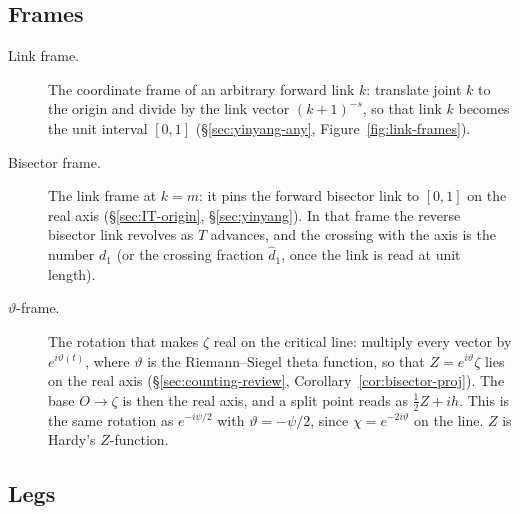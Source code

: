 \documentclass[11pt]{article}
\theoremstyle{definition}
\begin{document}
\subsection*{Frames}

\begin{description}
\item[Link frame.]
The coordinate frame of an arbitrary forward link $k$: translate
joint $k$ to the origin and divide by the link vector $(k+1)^{-s}$,
so that link $k$ becomes the unit interval $[0,1]$
(\S\ref{sec:yinyang-any}, Figure~\ref{fig:link-frames}).

\item[Bisector frame.]
The link frame at $k=m$: it pins the forward bisector link to
$[0,1]$ on the real axis
(\S\ref{sec:IT-origin}, \S\ref{sec:yinyang}).
In that frame the reverse bisector link revolves as $T$ advances,
and the crossing with the axis is the number $d_1$
(or the crossing fraction $\hat d_1$, once the link is read at unit
length).

\item[$\vartheta$-frame.]
The rotation that makes $\zeta$ real on the critical line:
multiply every vector by $e^{i\vartheta(t)}$, where $\vartheta$ is
the Riemann--Siegel theta function, so that
$Z=e^{i\vartheta}\zeta$ lies on the real axis
(\S\ref{sec:counting-review}, Corollary~\ref{cor:bisector-proj}).
The base $O\to\zeta$ is then the real axis, and a split point
reads as $\tfrac12 Z+ih$.
This is the same rotation as $e^{-i\psi/2}$ with
$\vartheta=-\psi/2$, since $\chi=e^{-2i\vartheta}$ on the line.
$Z$ is Hardy's $Z$-function.
\end{description}

\subsection*{Legs}
\end{document}
